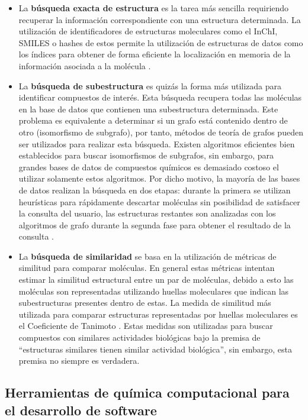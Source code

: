 \begin{itemize}
    \item La \textbf{búsqueda exacta de estructura} es la tarea más sencilla requiriendo recuperar la información correspondiente con una estructura determinada. La utilización de identificadores de estructuras moleculares como el InChI, SMILES o hashes de estos permite la utilización de estructuras de datos como los índices para obtener de forma eficiente la localización en memoria de la información asociada a la molécula \cite{leach2007introduction}. 
    \item La \textbf{búsqueda de subestructura} es quizás la forma más utilizada para identificar compuestos de interés. Esta búsqueda recupera todas las moléculas en la base de datos que contienen una subestructura determinada. Este problema es equivalente a determinar si un grafo está contenido dentro de otro (isomorfismo de subgrafo), por tanto, métodos de teoría de grafos pueden ser utilizados para realizar esta búsqueda. Existen algoritmos eficientes bien establecidos para buscar isomorfismos de subgrafos, sin embargo, para grandes bases de datos de compuestos químicos es demasiado costoso el utilizar solamente estos algoritmos. Por dicho motivo, la mayoría de las bases de datos realizan la búsqueda en dos etapas: durante la primera se utilizan heurísticas para rápidamente descartar moléculas sin posibilidad de satisfacer la consulta del usuario, las estructuras restantes son analizadas con los algoritmos de grafo durante la segunda fase para obtener el resultado de la consulta \cite{willett2005searching}. 
    \item La \textbf{búsqueda de similaridad} se basa en la utilización de métricas de similitud para comparar moléculas. En general estas métricas intentan estimar la similitud estructural entre un par de moléculas, debido a esto las moléculas son representadas utilizando huellas moleculares que indican las subestructuras presentes dentro de estas. La medida de similitud más utilizada para comparar estructuras representadas por huellas moleculares es el Coeficiente de Tanimoto \cite{bajusz2015tanimoto}. Estas medidas son utilizadas para buscar compuestos con similares actividades biológicas bajo la premisa de “estructuras similares tienen similar actividad biológica”, sin embargo, esta premisa no siempre es verdadera.
\end{itemize}



\subsection{Herramientas de química computacional para el desarrollo de software}

